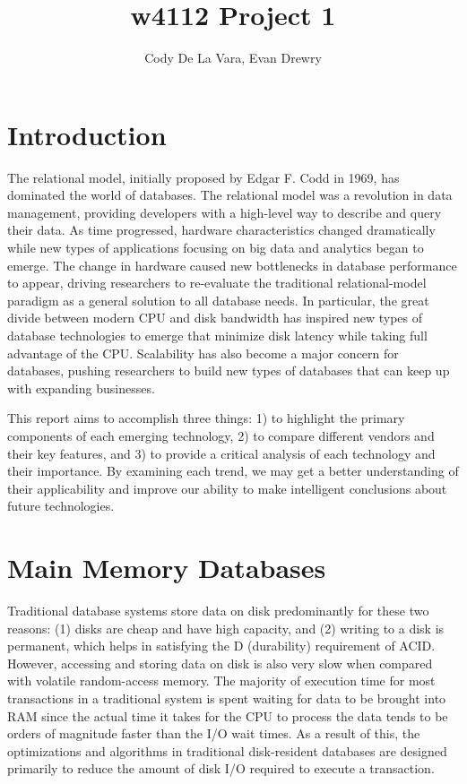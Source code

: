 \documentclass[11pt,a4paper]{report}
\author{Cody De La Vara, Evan Drewry}
\title{w4112 Project 1}
\begin{document}
\maketitle
\chapter{Introduction}
The relational model, initially proposed by Edgar F. Codd in 1969, has dominated the world of databases.\cite{cod70} The relational model was a revolution in data management, providing developers with a high-level way to describe and query their data. \cite{cod70} As time progressed, hardware characteristics changed dramatically while new types of applications focusing on big data and analytics began to emerge. The change in hardware caused new bottlenecks in database performance to appear, driving researchers to re-evaluate the traditional relational-model paradigm as a general solution to all database needs. In particular, the great divide between modern CPU and disk bandwidth has inspired new types of database technologies to emerge that minimize disk latency while taking full advantage of the CPU. Scalability has also become a major concern for databases, pushing researchers to build new types of databases that can keep up with expanding businesses.

This report aims to accomplish three things: 1) to highlight the primary components of each emerging technology, 2) to compare different vendors and their key features, and 3) to provide a critical analysis of each technology and their importance.  By examining each trend, we may get a better understanding of their applicability and improve our ability to make intelligent conclusions about future technologies.

\chapter{Main Memory Databases}
Traditional database systems store data on disk predominantly for these two reasons: (1) disks are cheap and have high capacity, and (2) writing to a disk is permanent, which helps in satisfying the D (durability) requirement of ACID. However, accessing and storing data on disk is also very slow when compared with volatile random-access memory. The majority of execution time for most transactions in a traditional system is spent waiting for data to be brought into RAM since the actual time it takes for the CPU to process the data tends to be orders of magnitude faster than the I/O wait times. As a result of this, the optimizations and algorithms in traditional disk-resident databases are designed primarily to reduce the amount of disk I/O required to execute a transaction.
\end{document}
